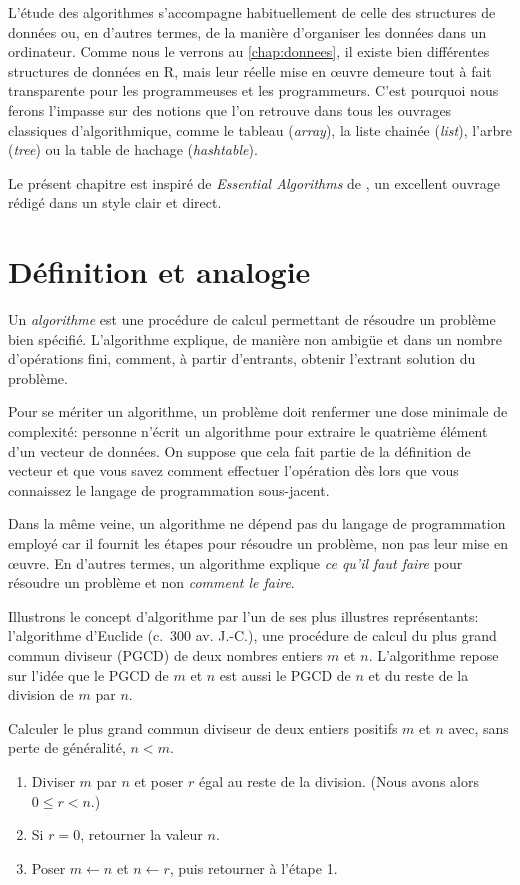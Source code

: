 L'étude des algorithmes s'accompagne habituellement de celle des
structures de données ou, en d'autres termes, de la manière
d'organiser les données dans un ordinateur. Comme nous le verrons au
\autoref{chap:donnees}, il existe bien différentes structures de
données en R, mais leur réelle mise en œuvre demeure tout à fait
transparente pour les programmeuses et les programmeurs. C'est
pourquoi nous ferons l'impasse sur des notions que l'on retrouve dans
tous les ouvrages classiques d'algorithmique, comme le tableau
(\emph{array}), la liste chainée (\emph{list}), l'arbre (\emph{tree})
ou la table de hachage (\emph{hashtable}).

Le présent chapitre est inspiré de \emph{Essential Algorithms} de
\citet{Stephens:algorithms:2013}, un excellent ouvrage rédigé dans un
style clair et direct.

\section{Définition et analogie}
\label{sec:algorithmes:definition}

Un \emph{algorithme} est une procédure de calcul
permettant de résoudre un problème bien spécifié. L'algorithme
explique, de manière non ambigüe et dans un nombre d'opérations fini,
comment, à partir d'entrants, obtenir l'extrant solution du problème.

Pour se mériter un algorithme, un problème doit renfermer une dose
minimale de complexité: personne n'écrit un algorithme pour extraire
le quatrième élément d'un vecteur de données. On suppose que cela fait
partie de la définition de vecteur et que vous savez comment effectuer
l'opération dès lors que vous connaissez le langage de programmation
sous-jacent.

Dans la même veine, un algorithme ne dépend pas du langage de
programmation employé car il fournit les étapes pour résoudre un
problème, non pas leur mise en œuvre. En d'autres termes, un
algorithme explique \emph{ce qu'il faut faire} pour résoudre un
problème et non \emph{comment le faire}.

Illustrons le concept d'algorithme par l'un de ses plus illustres
représentants: l'algorithme d'Euclide (c.~300 av. J.-C.), une procédure
de calcul du plus grand commun diviseur (PGCD) de deux nombres entiers
$m$ et $n$. L'algorithme repose sur l'idée que le PGCD de $m$ et $n$
est aussi le PGCD de $n$ et du reste de la division de $m$ par $n$.

\begin{algorithme}
  \label{algo:algorithmes:euclide}
  Calculer le plus grand commun diviseur de deux entiers positifs $m$
  et $n$ avec, sans perte de généralité, $n < m$.
  \begin{enumerate}
  \item Diviser $m$ par $n$ et poser $r$ égal au reste de la division.
    (Nous avons alors $0 \leq r < n$.)
  \item Si $r = 0$, retourner la valeur $n$.
  \item Poser $m \leftarrow n$ et $n \leftarrow r$, puis retourner à
    l'étape 1.
  \end{enumerate}
\end{algorithme}

